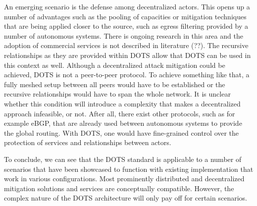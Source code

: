 An emerging scenario is the defense among decentralized actors. This opens up a number of advantages such as the pooling of capacities or mitigation techniques that are being applied closer to the source, such as egress filtering provided by a number of autonomous systems. There is ongoing research in this area and the adoption of commercial services is not described in literature (??). The recursive relationships as they are provided within DOTS allow that DOTS can be used in this context as well. Although a decentralized attack mitigation could be achieved, DOTS is not a peer-to-peer protocol. To achieve something like that, a fully meshed setup between all peers would have to be established or the recursive relationships would have to span the whole network. It is unclear whether this condition will introduce a complexity that makes a decentralized approach infeasible, or not. After all, there exist other protocols, such as for example eBGP, that are already used between autonomous systems to provide the global routing. With DOTS, one would have fine-grained control over the protection of services and relationships between actors.

To conclude, we can see that the DOTS standard is applicable to a number of scenarios that have been showcased to function with existing implementation that work in various configurations. Most prominently distributed and decentralized mitigation solutions and services are conceptually compatible. However, the complex nature of the DOTS architecture will only pay off for certain scenarios.


